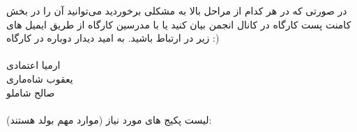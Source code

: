 \documentclass[a4paper]{article}
\begin{document}
	 در صورتی که در هر کدام از مراحل بالا به مشکلی برخوردید می‌توانید آن را در بخش کامنت پست کارگاه در کانال انجمن بیان کنید یا با مدرسین کارگاه از طریق ایمیل های زیر در ارتباط باشید. به امید دیدار دوباره در کارگاه :)
	\\ \\ ارمیا اعتمادی \quad {}
	\\ یعقوب شاه‌ماری \quad {}
	\\ صالح شاملو \quad {}
	  \\ \\
	لیست پکیج های مورد نیاز (موارد مهم بولد هستند): \\
	 \\
	
\end{document}
